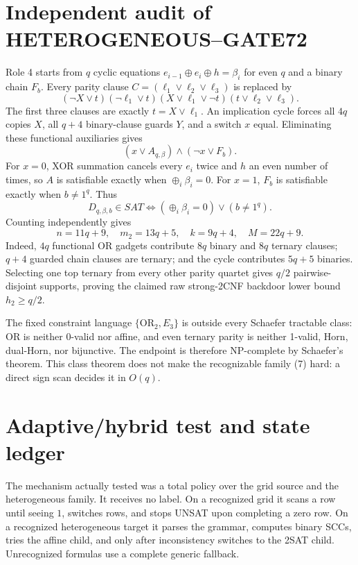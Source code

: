 \documentclass[11pt]{article}
\begin{document}
\section{Independent audit of HETEROGENEOUS--GATE72}
Role 4 starts from $q$ cyclic equations
$e_{i-1}\oplus e_i\oplus h=\beta_i$ for even $q$ and a binary chain $F_b$.
Every parity clause $C=(\ell_1\vee\ell_2\vee\ell_3)$ is replaced by
\[
(\neg X\vee t)(\neg\ell_1\vee t)
(X\vee\ell_1\vee\neg t)(t\vee\ell_2\vee\ell_3).
\tag{5}
\]
The first three clauses are exactly $t=X\vee\ell_1$.  An implication cycle
forces all $4q$ copies $X$, all $q+4$ binary-clause guards $Y$, and a switch
$x$ equal.  Eliminating these functional auxiliaries gives
\[
(x\vee A_{q,\beta})\wedge(\neg x\vee F_b).
\tag{6}
\]
For $x=0$, XOR summation cancels every $e_i$ twice and $h$ an even number of
times, so $A$ is satisfiable exactly when $\oplus_i\beta_i=0$.  For $x=1$,
$F_b$ is satisfiable exactly when $b\ne1^q$.  Thus
\[
D_{q,\beta,b}\in SAT\iff(\oplus_i\beta_i=0)\lor(b\ne1^q).
\tag{7}
\]
Counting independently gives
\[
n=11q+9,\quad m_2=13q+5,\quad k=9q+4,\quad M=22q+9.
\tag{8}
\]
Indeed, $4q$ functional OR gadgets contribute $8q$ binary and $8q$ ternary
clauses; $q+4$ guarded chain clauses are ternary; and the cycle contributes
$5q+5$ binaries.  Selecting one top ternary from every other parity quartet
gives $q/2$ pairwise-disjoint supports, proving the claimed raw strong-2CNF
backdoor lower bound $h_2\ge q/2$.

The fixed constraint language $\{\mathrm{OR}_2,E_3\}$ is outside every
Schaefer tractable class: OR is neither 0-valid nor affine, and even ternary
parity is neither 1-valid, Horn, dual-Horn, nor bijunctive.  The endpoint is
therefore NP-complete by Schaefer's theorem.  This class theorem does not make
the recognizable family (7) hard: a direct sign scan decides it in $O(q)$.

\section{Adaptive/hybrid test and state ledger}
The mechanism actually tested was a total policy over the grid source and the
heterogeneous family.  It receives no label.  On a recognized grid it scans a
row until seeing $1$, switches rows, and stops UNSAT upon completing a zero
row.  On a recognized heterogeneous target it parses the grammar, computes
binary SCCs, tries the affine child, and only after inconsistency switches to
the 2SAT child.  Unrecognized formulas use a complete generic fallback.
\end{document}

